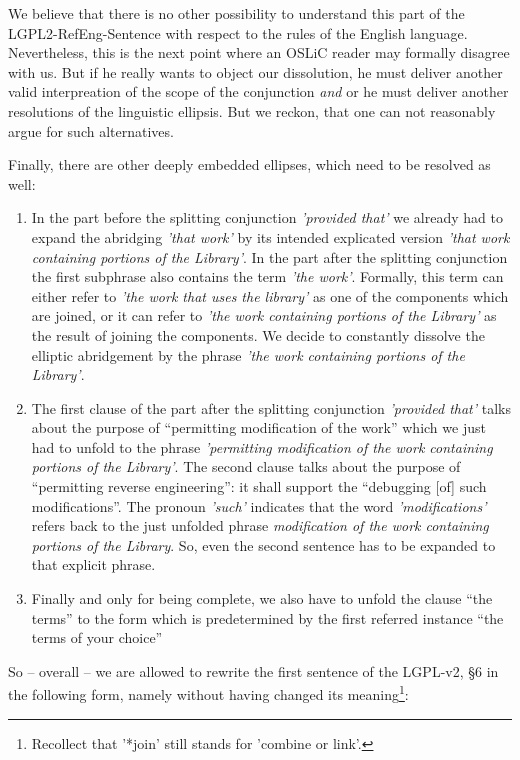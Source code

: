 We believe that there is no other possibility to understand this part of the 
LGPL2-RefEng-Sentence with respect to the rules of the English language.
Nevertheless, this is the next point where an OSLiC reader may formally disagree
with us. But if he really wants to object our dissolution, he must deliver
another valid interpreation of the scope of the conjunction \emph{and} or he
must deliver another resolutions of the linguistic ellipsis. But we reckon, that
one can not reasonably argue for such alternatives.

Finally, there are other deeply embedded ellipses, which need to be resolved
as well:

\begin{enumerate}
  \item  In the part before the splitting conjunction \emph{'provided that'} we
  already had to expand the abridging \emph{'that work'} by its intended
  explicated version \emph{'that work containing portions of the Library'}.  In
  the part after the splitting conjunction the first subphrase also contains the
  term \emph{'the work'}. Formally, this term can either refer to \emph{'the
  work that uses the library'} as one of the components which are joined, or it
  can refer to \emph{'the work containing portions of the Library'} as the
  result of joining the components. We decide to constantly dissolve the
  elliptic abridgement by the phrase \emph{'the work containing portions of the
  Library'}.
  \item The first clause of the part after the splitting conjunction
  \emph{'provided that'} talks about the purpose of \enquote{permitting
  modification of the work} which we just had to unfold to the phrase
  \emph{'permitting modification of the work containing portions of the
  Library'}. The second clause talks about the purpose of \enquote{permitting
  reverse engineering}: it shall support the \enquote{debugging [of] such
  modifications}. The pronoun \emph{'such'} indicates that the word
  \emph{'modifications'} refers back to the just unfolded phrase
  \emph{modification of the work containing portions of the Library}. So, even
  the second sentence has to be expanded to that explicit phrase.
  \item Finally and only for being complete, we also have to unfold the clause
  \enquote{the terms} to the form which is predetermined by the first referred
  instance \enquote{the terms of your choice}
\end{enumerate}

So -- overall -- we are allowed to rewrite the first sentence of the LGPL-v2, §6
in the following form, namely without having changed its
meaning\footnote{Recollect that '*join' still stands for 'combine or link'.}:

